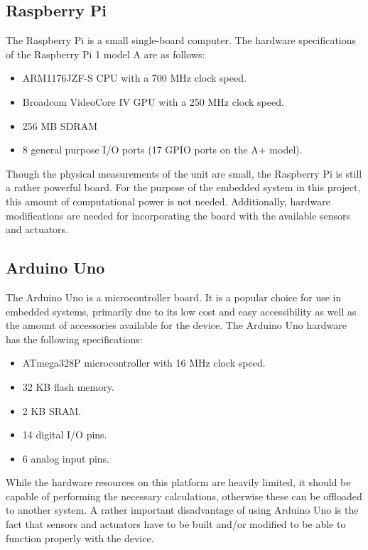 \subsection{Raspberry Pi}\label{raspberry}
The Raspberry Pi is a small single-board computer. The hardware specifications of the Raspberry Pi 1 model A are as follows:

\begin{itemize}
  \item ARM1176JZF-S CPU with a 700 MHz clock speed.
  \item Broadcom VideoCore IV GPU with a 250 MHz clock speed.
  \item 256 MB SDRAM
  \item 8 general purpose I/O ports (17 GPIO ports on the A+ model).
\end{itemize}

Though the physical measurements of the unit are small, the Raspberry Pi is still a rather powerful board. For the purpose of the embedded system in this project, this amount of computational power is not needed. Additionally, hardware modifications are needed for incorporating the board with the available sensors and actuators. 

\subsection{Arduino Uno}\label{arduino}
The Arduino Uno is a microcontroller board. It is a popular choice for use in embedded systems, primarily due to its low cost and easy accessibility as well as the amount of accessories available for the device. The Arduino Uno hardware has the following specifications:

\begin{itemize}
  \item ATmega328P microcontroller with 16 MHz clock speed.
  \item 32 KB flash memory.
  \item 2 KB SRAM.
  \item 14 digital I/O pins.
  \item 6 analog input pins.
\end{itemize}

While the hardware resources on this platform are heavily limited, it should be capable of performing the necessary calculations, otherwise these can be offloaded to another system. A rather important disadvantage of using Arduino Uno is the fact that sensors and actuators have to be built and/or modified to be able to function properly with the device. 

